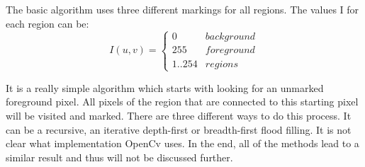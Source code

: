 The basic algorithm uses three different markings for all regions. The values I for each region can be:
\begin{equation}I(u,v) = \begin{cases} 0 & background \\  255 & foreground \\ 1..254 & regions \end{cases} \end{equation}

It is a really simple algorithm which starts with looking for an unmarked foreground pixel. All pixels of the region that are connected to this starting pixel will be visited and marked. There are three different ways to do this process. It can be a recursive, an iterative depth-first or breadth-first flood filling. It is not clear what implementation OpenCv uses. In the end, all of the methods lead to a similar result and thus will not be discussed further. 


